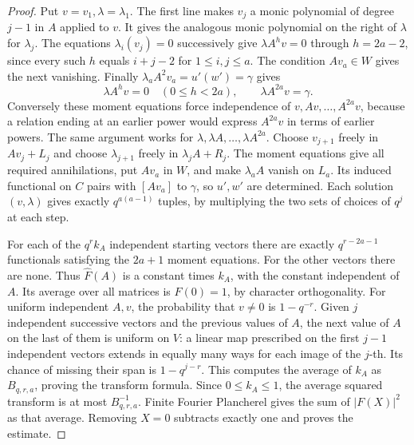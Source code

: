 \documentclass[a4paper,11pt]{article}
\theoremstyle{definition}
\theoremstyle{remark}
\numberwithin{equation}{section}
\begin{document}
\begin{proof}
Put \(v=v_1,\lambda=\lambda_1\). The first line makes \(v_j\)
a monic polynomial of degree \(j-1\) in \(A\) applied to \(v\).
It gives the analogous monic polynomial on the right of
\(\lambda\) for \(\lambda_j\). The equations
\(\lambda_i(v_j)=0\) successively give
\(\lambda A^h v=0\) through \(h=2a-2\), since every such
\(h\) equals \(i+j-2\) for \(1\le i,j\le a\).
The condition \(Av_a\in W\) gives the next vanishing. Finally
\(\lambda_a A^2v_a=u'(w')=\gamma\) gives
\[
       \lambda A^h v=0\quad(0\le h<2a),\qquad
       \lambda A^{2a}v=\gamma .
\]
Conversely these moment equations force independence of
\(v,Av,\ldots,A^{2a}v\), because a relation ending at an
earlier power would express \(A^{2a}v\) in terms of earlier
powers. The same argument works for
\(\lambda,\lambda A,\ldots,\lambda A^{2a}\).
Choose \(v_{j+1}\) freely in \(Av_j+L_j\) and choose
\(\lambda_{j+1}\) freely in \(\lambda_j A+R_j\). The moment
equations give all required annihilations, put \(Av_a\) in
\(W\), and make \(\lambda_a A\) vanish on \(L_a\).
Its induced functional on \(C\) pairs with \([Av_a]\) to
\(\gamma\), so \(u',w'\) are determined. Each solution
\((v,\lambda)\) gives exactly \(q^{a(a-1)}\) tuples, by
multiplying the two sets of choices of \(q^j\) at each step.

For each of the \(q^r k_A\) independent starting vectors
there are exactly \(q^{r-2a-1}\) functionals satisfying the
\(2a+1\) moment equations. For the other vectors there are
none. Thus \(\widehat F(A)\) is a constant times \(k_A\),
with the constant independent of \(A\). Its average over all
matrices is \(F(0)=1\), by character orthogonality.
For uniform independent \(A,v\), the probability that \(v\ne0\)
is \(1-q^{-r}\). Given \(j\) independent successive vectors
and the previous values of \(A\), the next value of \(A\) on
the last of them is uniform on \(V\): a linear map prescribed
on the first \(j-1\) independent vectors extends in equally
many ways for each image of the \(j\)-th. Its chance of missing
their span is \(1-q^{j-r}\). This computes the average of
\(k_A\) as \(B_{q,r,a}\), proving the transform formula.
Since \(0\le k_A\le1\), the average squared transform is at
most \(B_{q,r,a}^{-1}\). Finite Fourier Plancherel gives
the sum of \(|F(X)|^2\) as that average. Removing \(X=0\)
subtracts exactly one and proves the estimate.
\end{proof}
\end{document}

